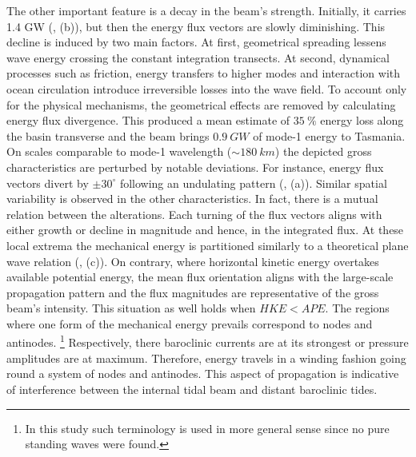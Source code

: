 \documentclass[12pt]{article}
\begin{document}
The other important feature is a decay in the beam's strength. Initially, it carries 1.4 GW 
(, (b)), but then the energy flux vectors are slowly diminishing. This 
decline is induced by two main factors. At first, geometrical spreading lessens wave energy 
crossing the constant integration transects. At second, dynamical processes such as friction, 
energy transfers to higher modes and interaction with ocean circulation introduce irreversible 
losses into the wave field. To account only for the physical mechanisms, the geometrical effects 
are removed by calculating energy flux divergence. This produced a mean estimate of $35~\%$ energy 
loss along the basin transverse and the beam brings $0.9~GW$ of mode-1 energy to Tasmania.\\

On scales comparable to mode-1 wavelength ($\sim 180~km$) the depicted gross characteristics are 
perturbed by  
notable deviations. For instance, energy flux vectors divert by $\pm 30^\circ$ following an 
undulating pattern (, (a)). Similar spatial variability is observed in the 
other characteristics. In fact, there is a mutual relation between the alterations. Each turning of 
the 
flux vectors aligns with either growth or decline in magnitude and hence, in the integrated flux. 
At these local extrema the mechanical energy is partitioned similarly to a theoretical plane wave 
relation (, (c)). On contrary, where horizontal kinetic energy overtakes 
available potential energy, the mean flux orientation aligns with the large-scale propagation 
pattern and the flux magnitudes are representative of the gross beam's intensity. This situation as 
well 
holds when $HKE < APE$. The regions where one form of the mechanical 
energy prevails correspond to nodes and antinodes. \footnote{In this study such terminology is used 
in more 
general sense since no pure standing waves were found.} Respectively, there baroclinic 
currents are at 
its strongest or pressure amplitudes are at maximum. Therefore, energy travels in a winding 
fashion going round a system of nodes and antinodes. This aspect of propagation is indicative of 
interference \citep{martini2007diagnosing, zhao2010long} between the internal tidal beam and 
distant baroclinic tides.\\
\end{document}

